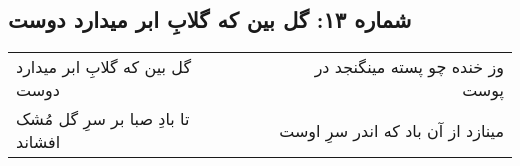 \begin{center}
\section*{شماره ۱۳: گل بین که گلابِ ابر میدارد دوست}
\label{sec:013}
\begin{longtable}{l p{0.5cm} r}
گل بین که گلابِ ابر میدارد دوست
&&
وز خنده چو پسته مینگنجد در پوست
\\
تا بادِ صبا بر سرِ گل مُشک افشاند
&&
مینازد از آن باد که اندر سرِ اوست
\\
\end{longtable}
\end{center}
